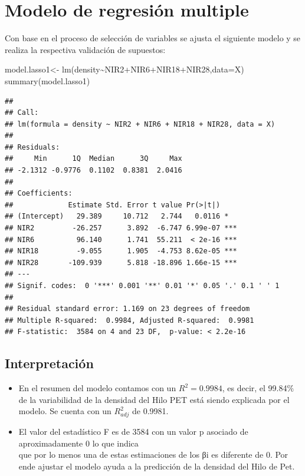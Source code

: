 \documentclass[
]{article}
\newenvironment{Shaded}{\begin{snugshade}}{\end{snugshade}}
\newcommand{\AttributeTok}[1]{\textcolor[rgb]{0.77,0.63,0.00}{#1}}
\newcommand{\FunctionTok}[1]{\textcolor[rgb]{0.00,0.00,0.00}{#1}}
\newcommand{\NormalTok}[1]{#1}
\newcommand{\OtherTok}[1]{\textcolor[rgb]{0.56,0.35,0.01}{#1}}
\newcommand{\SpecialCharTok}[1]{\textcolor[rgb]{0.00,0.00,0.00}{#1}}
\providecommand{\tightlist}{%
  \setlength{\itemsep}{0pt}\setlength{\parskip}{0pt}}
\begin{document}
\hypertarget{modelo-de-regresiuxf3n-multiple}{%
\section{Modelo de regresión
multiple}\label{modelo-de-regresiuxf3n-multiple}}

Con base en el proceso de selección de variables se ajusta el siguiente
modelo y se realiza la respectiva validación de supuestos:

\begin{Shaded}
\begin{Highlighting}[]
\NormalTok{model.lasso1}\OtherTok{\textless{}{-}} \FunctionTok{lm}\NormalTok{(density}\SpecialCharTok{\textasciitilde{}}\NormalTok{NIR2}\SpecialCharTok{+}\NormalTok{NIR6}\SpecialCharTok{+}\NormalTok{NIR18}\SpecialCharTok{+}\NormalTok{NIR28,}\AttributeTok{data=}\NormalTok{X)}
\FunctionTok{summary}\NormalTok{(model.lasso1)}
\end{Highlighting}
\end{Shaded}

\begin{verbatim}
## 
## Call:
## lm(formula = density ~ NIR2 + NIR6 + NIR18 + NIR28, data = X)
## 
## Residuals:
##     Min      1Q  Median      3Q     Max 
## -2.1312 -0.9776  0.1102  0.8381  2.0416 
## 
## Coefficients:
##             Estimate Std. Error t value Pr(>|t|)    
## (Intercept)   29.389     10.712   2.744   0.0116 *  
## NIR2         -26.257      3.892  -6.747 6.99e-07 ***
## NIR6          96.140      1.741  55.211  < 2e-16 ***
## NIR18         -9.055      1.905  -4.753 8.62e-05 ***
## NIR28       -109.939      5.818 -18.896 1.66e-15 ***
## ---
## Signif. codes:  0 '***' 0.001 '**' 0.01 '*' 0.05 '.' 0.1 ' ' 1
## 
## Residual standard error: 1.169 on 23 degrees of freedom
## Multiple R-squared:  0.9984, Adjusted R-squared:  0.9981 
## F-statistic:  3584 on 4 and 23 DF,  p-value: < 2.2e-16
\end{verbatim}

\hypertarget{interpretaciuxf3n}{%
\subsection{Interpretación}\label{interpretaciuxf3n}}

\begin{itemize}
\tightlist
\item
  En el resumen del modelo contamos con un \(R^2=0.9984\), es decir, el
  99.84\(\%\) de la variabilidad de la densidad del Hilo PET está siendo
  explicada por el modelo. Se cuenta con un \(R^2_{adj}\) de 0.9981.
\item
  El valor del estadístico F es de 3584 con un valor p asociado de
  aproximadamente 0 lo que indica\\
  que por lo menos una de estas estimaciones de los βi es diferente de
  0. Por ende ajustar el modelo ayuda a la predicción de la densidad del
  Hilo de Pet.
\end{itemize}
\end{document}
